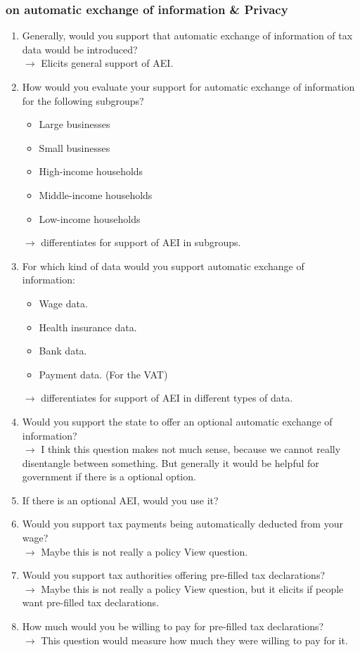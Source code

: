 \documentclass[12pt]{article}
\begin{document}
\subsubsection{on automatic exchange of information \& Privacy}
\begin{enumerate}
    \item Generally, would you support that automatic exchange of information of tax data would be introduced? \\ $\rightarrow$ Elicits general support of AEI. 
    \item How would you evaluate your support for automatic exchange of information for the following subgroups?
        \begin{itemize}
        \item Large businesses
        \item Small businesses
        \item High-income households
        \item Middle-income households
        \item Low-income households
    \end{itemize} $\rightarrow$ differentiates for support of AEI in subgroups.
    \item For which kind of data would you support automatic exchange of information: 
    \begin{itemize}
        \item Wage data.
        \item Health insurance data.
        \item Bank data.
        \item Payment data. (For the VAT)
    \end{itemize} $\rightarrow$ differentiates for support of AEI in different types of data.
    \item Would you support the state to offer an optional automatic exchange of information?  \\ $\rightarrow$ I think this question makes not much sense, because we cannot really disentangle between something. But generally it would be helpful for government if there is a optional option.
    \item If there is an optional AEI, would you use it? 
    \item Would you support tax payments being automatically deducted from your wage? \\ $\rightarrow$ Maybe this is not really a policy View question.
    \item Would you support tax authorities offering pre-filled tax declarations?\\ $\rightarrow$ Maybe this is not really a policy View question, but it elicits if people want pre-filled tax declarations.
    \item How much would you be willing to pay for pre-filled tax declarations?\\ $\rightarrow$ This question would measure how much they were willing to pay for it. 
\end{enumerate}
\end{document}
